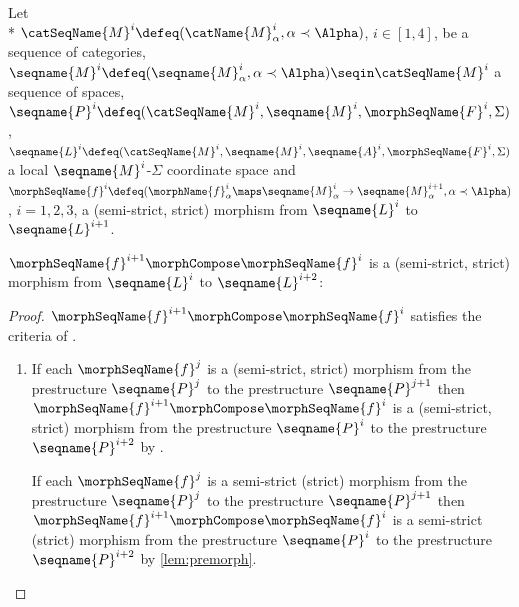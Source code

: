 \documentclass{article}
\begin{document}
\begin{lemma}
\label{lem:LCSmorphcomp}
Let \\*
$\catSeqName{M}^i \defeq (\catName{M}^i_\alpha, \alpha \prec \Alpha)$,
$i \in [1,4]$, be a sequence of categories,
$
  \seqname{M}^i \defeq (\seqname{M}^i_\alpha, \alpha \prec \Alpha)
  \seqin \catSeqName{M}^i
$
a sequence of spaces,
$
  \seqname{P}^i \defeq
  (
    \catSeqName{M}^i,
    \seqname{M}^i,
    \morphSeqName{F}^i,
    \Sigma
  )
$,
$
  \seqname{L}^i \defeq
  (
    \catSeqName{M}^i,
    \seqname{M}^i,
    \seqname{A}^i,
    \morphSeqName{F}^i,
    \Sigma
  )
$
a local $\seqname{M}^i$-$\Sigma$ coordinate space
and
$
  \morphSeqName{f}^i \defeq
    (
      \morphName{f}^i_\alpha \maps
        \seqname{M}^i_\alpha \to \seqname{M}^{i+1}_\alpha,
      \alpha \prec \Alpha
    )
$,
$i=1,2,3$,
a (semi-strict, strict) morphism from $\seqname{L}^i$ to
$\seqname{L}^{i+1}$.

$\morphSeqName{f}^{i+1} \morphCompose \morphSeqName{f}^i$ is
a (semi-strict, strict) morphism from $\seqname{L}^i$ to
$\seqname{L}^{i+2}$:

\begin{proof}
$\morphSeqName{f}^{i+1} \morphCompose \morphSeqName{f}^i$ satisfies the
criteria of .

\begin{enumerate}
\item If each $\morphSeqName{f}^j$ is a (semi-strict, strict) morphism
from the prestructure $\seqname{P}^j$ to the prestructure
$\seqname{P}^{j+1}$ then
$\morphSeqName{f}^{i+1} \morphCompose \morphSeqName{f}^i$ is a
(semi-strict, strict) morphism from the prestructure $\seqname{P}^i$ to
the prestructure $\seqname{P}^{i+2}$ by
.

If each $\morphSeqName{f}^j$ is a semi-strict (strict) morphism from the
prestructure $\seqname{P}^j$ to the prestructure $\seqname{P}^{j+1}$
then $\morphSeqName{f}^{i+1} \morphCompose \morphSeqName{f}^i$ is a semi-strict
(strict) morphism from the prestructure $\seqname{P}^i$ to the
prestructure $\seqname{P}^{i+2}$ by \cref{lem:premorph}.


\end{enumerate}
\end{proof}
\end{lemma}
\end{document}
